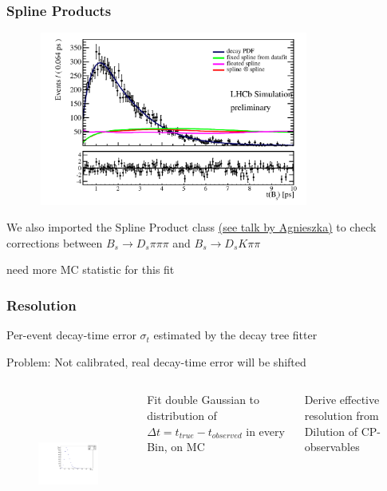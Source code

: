\documentclass[]{beamer}
\begin{document}
\begin{frame}
\frametitle{Spline Products}

\begin{figure}[h]
\includegraphics[width=0.8\textwidth,height=5.7cm]{plots/timeAccFit_MC_Norm_default.pdf}
\end{figure}

We also imported the Spline Product class \textcolor{blue}{\href{https://indico.cern.ch/event/606600/contributions/2692163/attachments/1508860/2352208/2017-08-16-DsK-SplineProduct.pdf}{(see talk by Agnieszka)}} to check corrections between $B_{s}\to D_{s} \pi\pi\pi$ and $B_{s}\to D_{s} K\pi\pi$ \newline

need more MC statistic for this fit

\end{frame}

\begin{frame}
\frametitle{Resolution}

Per-event decay-time error $\sigma_{t}$ estimated by the decay tree fitter \newline

Problem: Not calibrated, real decay-time error will be shifted


\begin{columns}


 \begin{figure}[h]
\includegraphics[width=5.5cm,height=4.7cm]{plots/Bs_cterr_MC.pdf}
\end{figure}


Fit double Gaussian to distribution of $\Delta t = t_{true} - t_{observed}$ in every Bin, on MC \newline

Derive effective resolution from Dilution of CP-observables 

\end{columns}

\end{frame}
\end{document}
